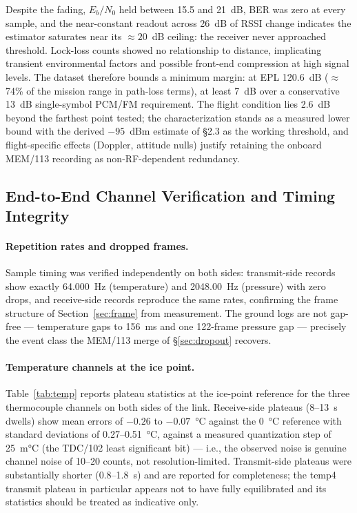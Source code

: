 \documentclass[12pt,letterpaper]{article}
\begin{document}
Despite the fading, $E_b/N_0$ held between 15.5 and 21~dB, BER was zero
at every sample, and the near-constant readout across 26~dB of RSSI change
indicates the estimator saturates near its ${\approx}20$~dB ceiling: the
receiver never approached threshold. Lock-loss counts showed no
relationship to distance, implicating transient environmental factors and
possible front-end compression at high signal levels. The dataset
therefore bounds a minimum margin: at EPL 120.6~dB (${\approx}$74\% of
the mission range in path-loss terms), at least 7~dB over a conservative
13~dB single-symbol PCM/FM requirement. The flight condition lies 2.6~dB
beyond the farthest point tested; the characterization stands as a
measured lower bound with the derived $-95$~dBm estimate of \S2.3 as the
working threshold, and flight-specific effects (Doppler, attitude nulls)
justify retaining the onboard MEM/113 recording as non-RF-dependent
redundancy.

\subsection{End-to-End Channel Verification and Timing Integrity}\label{sec:res-chan}

\paragraph{Repetition rates and dropped frames.}
Sample timing was verified independently on both sides: transmit-side
records show exactly 64.000~Hz (temperature) and 2048.00~Hz (pressure)
with zero drops, and receive-side records reproduce the same rates,
confirming the frame structure of Section~\ref{sec:frame} from
measurement. The ground logs are not gap-free --- temperature gaps to
156~ms and one 122-frame pressure gap --- precisely the event class the
MEM/113 merge of \S\ref{sec:dropout} recovers.

\paragraph{Temperature channels at the ice point.}
Table~\ref{tab:temp} reports plateau statistics at the ice-point reference for
the three thermocouple channels on both sides of the link. Receive-side
plateaus (8--13~s dwells) show mean errors of $-0.26$ to $-0.07$~\si{\celsius}
against the 0~\si{\celsius} reference with standard deviations of 0.27--0.51~\si{\celsius},
against a measured quantization step of 25~m\si{\celsius} (the TDC/102 least
significant bit) --- i.e., the observed noise is genuine channel noise of
10--20 counts, not resolution-limited. Transmit-side plateaus were
substantially shorter (0.8--1.8~s) and are reported for completeness; the
temp4 transmit plateau in particular appears not to have fully equilibrated
and its statistics should be treated as indicative only.
\end{document}
